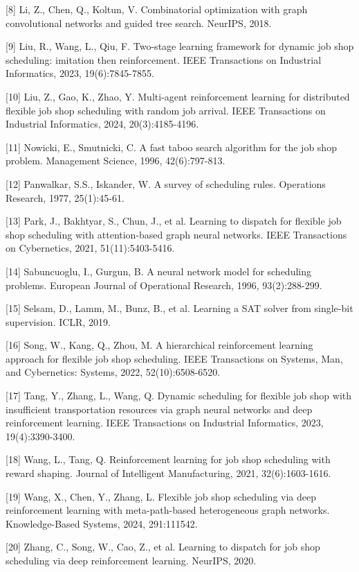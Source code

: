 \documentclass{article}
\begin{document}
{[}8{]} Li, Z., Chen, Q., Koltun, V. Combinatorial optimization with graph convolutional networks and guided tree search. NeurIPS, 2018.

{[}9{]} Liu, R., Wang, L., Qiu, F. Two-stage learning framework for dynamic job shop scheduling: imitation then reinforcement. IEEE Transactions on Industrial Informatics, 2023, 19(6):7845-7855.

{[}10{]} Liu, Z., Gao, K., Zhao, Y. Multi-agent reinforcement learning for distributed flexible job shop scheduling with random job arrival. IEEE Transactions on Industrial Informatics, 2024, 20(3):4185-4196.

{[}11{]} Nowicki, E., Smutnicki, C. A fast taboo search algorithm for the job shop problem. Management Science, 1996, 42(6):797-813.

{[}12{]} Panwalkar, S.S., Iskander, W. A survey of scheduling rules. Operations Research, 1977, 25(1):45-61.

{[}13{]} Park, J., Bakhtyar, S., Chun, J., et al. Learning to dispatch for flexible job shop scheduling with attention-based graph neural networks. IEEE Transactions on Cybernetics, 2021, 51(11):5403-5416.

{[}14{]} Sabuncuoglu, I., Gurgun, B. A neural network model for scheduling problems. European Journal of Operational Research, 1996, 93(2):288-299.

{[}15{]} Selsam, D., Lamm, M., Bunz, B., et al. Learning a SAT solver from single-bit supervision. ICLR, 2019.

{[}16{]} Song, W., Kang, Q., Zhou, M. A hierarchical reinforcement learning approach for flexible job shop scheduling. IEEE Transactions on Systems, Man, and Cybernetics: Systems, 2022, 52(10):6508-6520.

{[}17{]} Tang, Y., Zhang, L., Wang, Q. Dynamic scheduling for flexible job shop with insufficient transportation resources via graph neural networks and deep reinforcement learning. IEEE Transactions on Industrial Informatics, 2023, 19(4):3390-3400.

{[}18{]} Wang, L., Tang, Q. Reinforcement learning for job shop scheduling with reward shaping. Journal of Intelligent Manufacturing, 2021, 32(6):1603-1616.

{[}19{]} Wang, X., Chen, Y., Zhang, L. Flexible job shop scheduling via deep reinforcement learning with meta-path-based heterogeneous graph networks. Knowledge-Based Systems, 2024, 291:111542.

{[}20{]} Zhang, C., Song, W., Cao, Z., et al. Learning to dispatch for job shop scheduling via deep reinforcement learning. NeurIPS, 2020.
\end{document}
